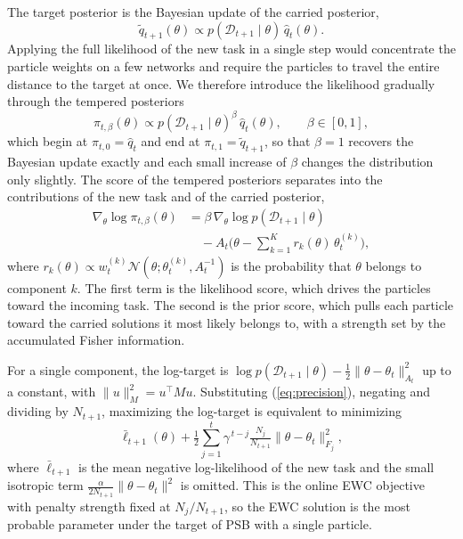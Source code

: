 The target posterior is the Bayesian update of the carried posterior,
\begin{equation}
    \tilde q_{t+1}(\theta)\propto p(\mathcal{D}_{t+1}\mid\theta)\,\hat q_t(\theta).
    \label{eq:target}
\end{equation}
Applying the full likelihood of the new task in a single step
would concentrate the particle weights on a few networks and require the
particles to travel the entire distance to the target at once. We therefore
introduce the likelihood gradually through the tempered posteriors
\begin{equation}
    \pi_{t,\beta}(\theta)\propto p(\mathcal{D}_{t+1}\mid\theta)^{\beta}\,
    \hat q_t(\theta), \qquad \beta\in[0,1],
    \label{eq:tempered}
\end{equation}
which begin at $\pi_{t,0}=\hat q_t$ and end at $\pi_{t,1}=\tilde q_{t+1}$, so that
$\beta=1$ recovers the Bayesian update exactly and each small increase of $\beta$
changes the distribution only slightly. The score of the tempered posteriors
separates into the contributions of the new task and of the carried posterior,
\begin{equation}
\begin{split}
    \nabla_\theta\log\pi_{t,\beta}(\theta)
    &= \beta\,\nabla_\theta\log p(\mathcal{D}_{t+1}\mid\theta)\\
    &\quad -A_t\Big(\theta-\textstyle\sum_{k=1}^{K}r_k(\theta)\,\theta_t^{(k)}\Big),
\end{split}
\label{eq:pathscore}
\end{equation}
where $r_k(\theta)\propto w_t^{(k)}\mathcal{N}(\theta;\theta_t^{(k)},A_t^{-1})$
is the probability that $\theta$ belongs to component $k$. The first term is the
likelihood score, which drives the particles toward the incoming task. The
second is the prior score, which pulls each particle toward the carried
solutions it most likely belongs to, with a strength set by the accumulated
Fisher information.

For a single component, the log-target is
$\log p(\mathcal{D}_{t+1}\mid\theta)-\tfrac12\|\theta-\theta_t\|_{A_t}^2$ up to a
constant, with $\|u\|_M^2=u^{\top}Mu$. Substituting (\ref{eq:precision}),
negating and dividing by $N_{t+1}$, maximizing the log-target is equivalent to
minimizing
\begin{equation}
    \bar\ell_{t+1}(\theta)
    +\tfrac{1}{2}\textstyle\sum_{j=1}^{t}\gamma^{\,t-j}\tfrac{N_j}{N_{t+1}}
    \|\theta-\theta_t\|_{F_j}^{2},
    \label{eq:ewc}
\end{equation}
where $\bar\ell_{t+1}$ is the mean negative log-likelihood of the new task and
the small isotropic term $\tfrac{\alpha}{2N_{t+1}}\|\theta-\theta_t\|^2$ is
omitted. This is the online EWC
objective~\cite{kirkpatrick2017ewc,schwarz2018progress} with penalty strength
fixed at $N_j/N_{t+1}$, so the EWC solution is the most probable parameter under
the target of PSB with a single particle.

